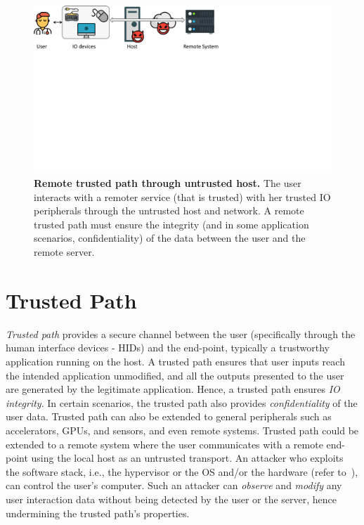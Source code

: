 \begin{figure}[t]
  \centering
    \includegraphics[trim={0 14cm 12cm 0},clip,width=\linewidth]{chapters/introduction/images/trustedPath.pdf}
    \caption[Remote trusted path through untrusted host]{\textbf{Remote trusted path through untrusted host.} The user interacts with a remoter service (that is trusted) with her trusted IO peripherals through the untrusted host and network. A remote trusted path must ensure the integrity (and in some application scenarios, confidentiality) of the data between the user and the remote server.}
    \label{fig:trustedPath}
\end{figure}

\section{Trusted Path}
\label{ch:intro:trustedPath}

\emph{Trusted path} provides a secure channel between the user (specifically through the human interface devices - HIDs) and the end-point, typically a trustworthy application running on the host. A trusted path ensures that user inputs reach the intended application unmodified, and all the outputs presented to the user are generated by the legitimate application. Hence, a trusted path ensures \emph{IO integrity}. In certain scenarios, the trusted path also provides \emph{confidentiality} of the user data. Trusted path can also be extended to general peripherals such as accelerators, GPUs, and sensors, and even remote systems. Trusted path could be extended to a remote system where the user communicates with a remote end-point using the local host as an untrusted transport. An attacker who exploits the software stack, i.e., the hypervisor or the OS and/or the hardware (refer to~), can control the user's computer. Such an attacker can \emph{observe} and \emph{modify} any user interaction data without being detected by the user or the server, hence undermining the trusted path's properties. 

